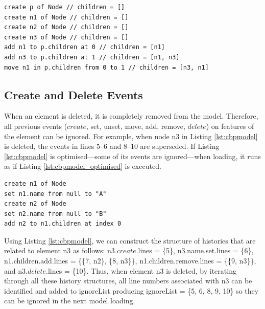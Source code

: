 {\vspace{-20pt}
\begin{lstlisting}[style=eol,caption={A naïve optimised CBP representation of original CBP representation in Listing \ref{lst:add_remove_move_reference}}, label=lst:naive_add_remove_move_reference]
create p of Node // children = []
create n1 of Node // children = []
create n2 of Node // children = []
create n3 of Node // children = []
add n1 to p.children at 0 // children = [n1]
add n3 to p.children at 1 // children = [n1, n3]
move n1 in p.children from 0 to 1 // children = [n3, n1]
\end{lstlisting}
  
  \subsection{Create and Delete Events}
  \label{subsec:create_and_delete_operations}
  
  When an element is deleted, it is completely removed from the model. Therefore, all previous events ($create$, \textsf{set}, \textsf{unset}, \textsf{move}, \textsf{add}, \textsf{remove}, $delete$) on features of the element can be ignored. For example, when node \textsf{n3} in Listing \ref{lst:cbpmodel} is deleted, the events in lines 5–6 and 8–10 are superseded. If Listing \ref{lst:cbpmodel} is optimised—some of its events are ignored—when loading, it runs as if Listing \ref{lst:cbpmodel_optimised} is executed.
  
\vspace{-20pt}
\begin{lstlisting}[style=eol,caption={Change-based representation of the model in Figure \ref{fig:tree_example} after removal of node \textsf{n3}.},label=lst:cbpmodel_optimised]
create n1 of Node
set n1.name from null to "A"
create n2 of Node
set n2.name from null to "B"
add n2 to n1.children at index 0
\end{lstlisting}
  
  Using Listing \ref{lst:cbpmodel}, we can construct the structure of histories that are related to element \textsf{n3} as follows: \textsf{n3}.$create$.\textsf{lines} = \{5\}, \textsf{n3}.\textsf{name}.\textsf{set}.\textsf{lines} = \{6\}, \textsf{n1}.\textsf{children}.\textsf{add}.\textsf{lines} = \{\{7, \textsf{n2}\}, \{8, \textsf{n3}\}\}, \textsf{n1}.\textsf{children}.\textsf{remove}.\textsf{lines} = \{\{9, \textsf{n3}\}\}, and \textsf{n3}.$delete$.\textsf{lines} = \{10\}. Thus, when element \textsf{n3} is deleted, by iterating through all these history structures, all line numbers associated with \textsf{n3} can be identified and added to \textsf{ignoreList} producing \textsf{ignoreList} = \{5, 6, 8, 9, 10\} so they can be ignored in the next model loading.
  
}
